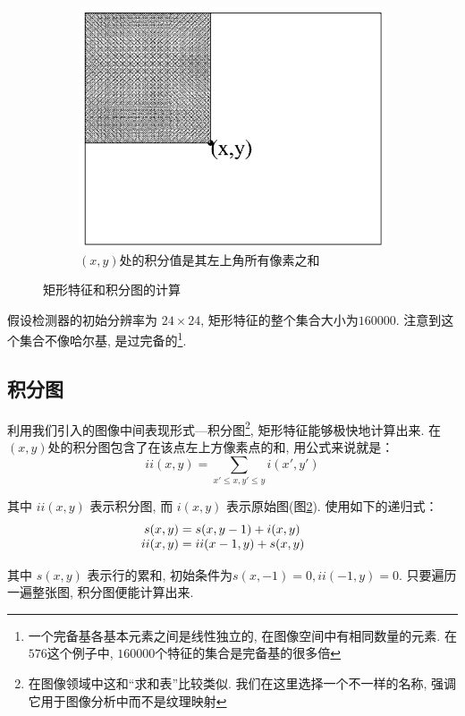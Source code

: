 \documentclass[a4paper,utf8,11pt]{ctexart}
\renewcommand{\captionlabelfont}{\kaishu\zihao{5}}
\begin{document}
\begin{figure}[!htb]
\begin{subfigure}{0.3\textwidth}
\includegraphics[width=\textwidth]{int.png}
\renewcommand{\captionlabelfont}{\kaishu\zihao{6}}
\caption{$(x,y)$处的积分值是其左上角所有像素之和}
\label{fig:int}
\end{subfigure}
\caption{矩形特征和积分图的计算}
\end{figure}

假设检测器的初始分辨率为 $24\times24$, 矩形特征的整个集合大小为$160000$. 注意到这个集合不像哈尔基, 是过完备的\footnote{一个完备基各基本元素之间是线性独立的, 在图像空间中有相同数量的元素. 在$576$这个例子中, $160000$个特征的集合是完备基的很多倍}.

\subsection{积分图}
利用我们引入的图像中间表现形式---积分图\footnote{在图像领域中这和``求和表''比较类似\citep{crow1984summed}. 我们在这里选择一个不一样的名称, 强调它用于图像分析中而不是纹理映射}, 矩形特征能够极快地计算出来. 在$(x, y)$处的积分图包含了在该点左上方像素点的和, 用公式来说就是：
\[
    ii(x, y)= \sum_{x'\leq x, y'\leq y} i(x', y')
\]

其中 $ii(x, y)$ 表示积分图, 而 $i(x, y)$ 表示原始图(图\ref{fig:int}). 使用如下的递归式：
\[
    \begin{array}{r@{}>{{}}l@{\qquad}r@{}>{{}}l}
        s(x,y)&=s(x,y-1)+i(x,y)\\
        ii(x,y)&=ii(x-1,y)+s(x,y)
    \end{array}
\]

其中 $s(x, y)$ 表示行的累和, 初始条件为$s(x,-1)=0, ii(-1,y)=0$. 只要遍历一遍整张图, 积分图便能计算出来. 
\end{document}
